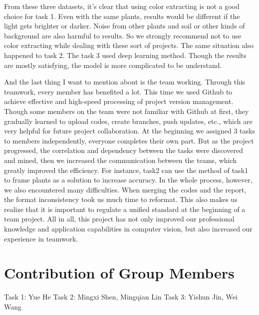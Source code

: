 \documentclass[conference]{IEEEtran}
\begin{document}
From these three datasets, it’s clear that using color extracting is not a good choice for task 1. Even with the same plants, results would be different if the light gets brighter or darker. Noise from other plants and soil or other kinds of background are also harmful to results. So we strongly recommend not to use color extracting while dealing with these sort of projects. The same situation also happened to task 2. The task 3 used deep learning method. Though the results are mostly satisfying, the model is more complicated to be understand. 

And the last thing I want to mention about is the team working. Through this teamwork, every member has benefited a lot. This time we used Github to achieve effective and high-speed processing of project version management. Though some members on the team were not familiar with Github at first, they gradually learned to upload codes, create branches, push updates, etc., which are very helpful for future project collaboration. At the beginning we assigned 3 tasks to members independently, everyone completes their own part. But as the project progressed, the correlation and dependency between the tasks were discovered and mined, then we increased the communication between the teams, which greatly improved the efficiency. For instance, task2 can use the method of task1 to frame plants as a solution to increase accuracy. In the whole process, however, we also encountered many difficulties. When merging the codes and the report, the format inconsistency took us much time to reformat. This also makes us realize that it is important to regulate a unified standard at the beginning of a team project. All in all, this project has not only improved our professional knowledge and application capabilities in computer vision, but also increased our experience in teamwork. 

\section{Contribution of Group Members}

Task 1: Yue He
Task 2: Mingxi Shen, Mingqian Lin
Task 3: Yishun Jin, Wei Wang




\end{document}

